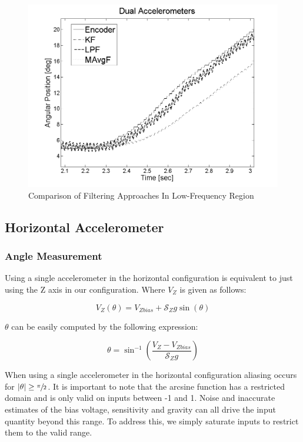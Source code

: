 \documentclass{article}
\theoremstyle{plain}
\theoremstyle{definition}
\theoremstyle{remark}
\newcommand{\Sens}{\mathcal{S}}
\begin{document}
\begin{figure}[hbt]
\begin{center}
\includegraphics[width = 12cm]{Filters_ZoomIn.png}
\caption{Comparison of Filtering Approaches In Low-Frequency Region}
\label{Filters_ZoomIn}
\end{center}
\end{figure}

\subsection{Horizontal Accelerometer}

\subsubsection{Angle Measurement}

Using a single accelerometer in the horizontal configuration is equivalent to just using the Z axis in our configuration.  Where $V_{Z}$ is given as follows: 

$$ V_{Z}(\theta) = V_{Zbias} + \Sens_{Z} g \sin(\theta) $$

$\theta$ can be easily computed by the following expression:

\begin{equation}
\theta = \sin^{-1}\left( \frac{V_{Z} - V_{Zbias}}{\Sens_{Z} g}\right) 
\label{horizontalEQ}
\end{equation}

When using a single accelerometer in the horizontal configuration aliasing occurs for $|\theta| \geq \sfrac{\pi}{2}$.  It is important to note that the arcsine function has a restricted domain and is only valid on inputs between -1 and 1.  Noise and inaccurate estimates of the bias voltage, sensitivity and gravity can all drive the input quantity beyond this range.  To address this, we simply saturate inputs to restrict them to the valid range.
\end{document}
